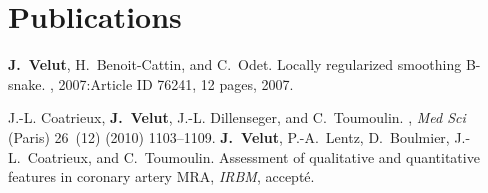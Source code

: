 %
\pagebreak
\section{Publications}
\label{sec:publications}
%
\small
\newcommand{\myitemsep}{0mm}
%
\renewcommand{\refname}{\normalsize{Journaux internationaux}}
\begin{thebibliography}{1}
\setlength{\itemsep}{\myitemsep}
%
\textbf{J.~Velut}, H.~Benoit-Cattin, and C.~Odet.
\newblock Locally regularized smoothing B-snake.
,
2007:Article ID 76241, 12 pages, 2007.
%
\end{thebibliography}
%
\renewcommand{\refname}{\normalsize{Journaux nationaux}}
\vspace{-10pt}
\begin{thebibliography}{1}
\setlength{\itemsep}{\myitemsep}
%
J.-L. Coatrieux, \textbf{J.~Velut}, J.-L. Dillenseger, and C.~Toumoulin.
,
\newblock \emph{Med Sci} (Paris) 26~(12) (2010) 1103--1109.
%
\textbf{J.~Velut}, P.-A.~Lentz, D.~Boulmier, J.-L.~Coatrieux, and C.~Toumoulin.
\newblock Assessment of qualitative and quantitative features in coronary artery
MRA,
\newblock \emph{IRBM}, accepté. 
\end{thebibliography}
%
\renewcommand{\refname}{\normalsize{Conf\'erences internationales avec
		    comit\'e de lecture }}
\vspace{-10pt}
